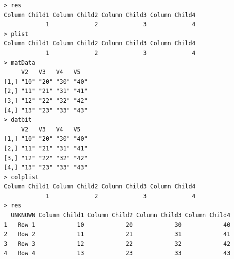 \documentclass[a4paper]{article}
\begin{document}
\begin{verbatim}
> res 
Column Child1 Column Child2 Column Child3 Column Child4 
            1             2             3             4 
> plist 
Column Child1 Column Child2 Column Child3 Column Child4 
            1             2             3             4 
> matData 
     V2   V3   V4   V5  
[1,] "10" "20" "30" "40"
[2,] "11" "21" "31" "41"
[3,] "12" "22" "32" "42"
[4,] "13" "23" "33" "43"
> datbit 
     V2   V3   V4   V5  
[1,] "10" "20" "30" "40"
[2,] "11" "21" "31" "41"
[3,] "12" "22" "32" "42"
[4,] "13" "23" "33" "43"
> colplist 
Column Child1 Column Child2 Column Child3 Column Child4 
            1             2             3             4 
> res 
  UNKNOWN Column Child1 Column Child2 Column Child3 Column Child4
1   Row 1            10            20            30            40
2   Row 2            11            21            31            41
3   Row 3            12            22            32            42
4   Row 4            13            23            33            43
\end{verbatim}
\end{document}

